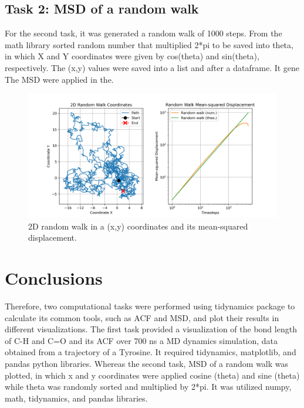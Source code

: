 \documentclass{article}
\begin{document}
\subsection{Task 2: MSD of a random walk}

For the second task, it was generated a random walk of 1000 steps. From the math library sorted random number that multiplied 2*pi to be saved into theta, in which X and Y coordinates were given by cos(theta) and sin(theta), respectively. The (x,y) values were saved into a list and after a dataframe. It gene The MSD were applied in the.

\begin{figure}[H]
\includegraphics[width=\linewidth]{msd_plot.png}
\caption{2D random walk in a (x,y) coordinates and its mean-squared displacement.}
\label{msd_plot}
\end{figure}

\section{Conclusions}

Therefore, two computational tasks were performed using tidynamics package to calculate its common tools, such as ACF and MSD, and plot their results in different visualizations. The first task provided a visualization of the bond length of C-H and C=O and its ACF over 700 ns a MD dynamics simulation, data obtained from a trajectory of a Tyrosine. It required tidynamics, matplotlib, and pandas python libraries. Whereas the second task, MSD of a random walk was plotted, in which x and y coordinates were applied cosine (theta) and sine (theta) while theta was randomly sorted and multiplied by 2*pi. It was utilized numpy, math, tidynamics, and pandas libraries.



\end{document}
